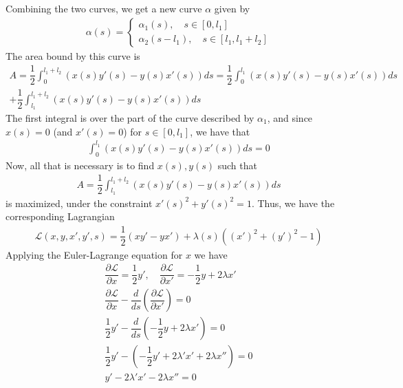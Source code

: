 \documentclass{article}
\begin{document}
	Combining the two curves, we get a new curve $\alpha$ given by
	\begin{gather*}
		\alpha(s) =
		\begin{cases}
			\alpha_1(s), \quad s \in [0, l_1] \\
			\alpha_2(s - l_1), \quad s \in [l_1, l_1 + l_2]
		\end{cases}
	\end{gather*}
	The area bound by this curve is
	\begin{gather*}
		A = \dfrac{1}{2} \int_{0}^{l_1 + l_2} \left( x(s) y'(s) - y(s) x'(s) \right) ds = \dfrac{1}{2} \int_{0}^{l_1} \left( x(s) y'(s) - y(s) x'(s) \right) ds \\
		+ \dfrac{1}{2} \int_{l_1}^{l_1 + l_2} \left( x(s) y'(s) - y(s) x'(s) \right) ds
	\end{gather*}
	The first integral is over the part of the curve described by $\alpha_1$, and since $x(s) = 0$ (and $x'(s) = 0$) for $s \in [0, l_1]$, we have that
	\begin{gather*}
		\int_{0}^{l_1} \left( x(s) y'(s) - y(s) x'(s) \right) ds = 0
	\end{gather*}
	Now, all that is necessary is to find $x(s), y(s)$ such that
	\begin{gather*}
		A = \dfrac{1}{2} \int_{l_1}^{l_1 + l_2} \left( x(s) y'(s) - y(s) x'(s) \right) ds
	\end{gather*}
	is maximized, under the constraint $x'(s)^2 + y'(s)^2 = 1$. Thus, we have the corresponding Lagrangian
	\begin{gather*}
		\mathcal{L}(x, y, x', y', s) = \dfrac{1}{2} \left( x y' - y x' \right) + \lambda(s) \left( \left( x' \right)^2 + \left( y' \right)^2 - 1 \right)
	\end{gather*}
	Applying the Euler-Lagrange equation for $x$ we have
	\begin{gather*}
		\dfrac{\partial \mathcal{L}}{\partial x} = \dfrac{1}{2} y', \quad
		\dfrac{\partial \mathcal{L}}{\partial x'} = -\dfrac{1}{2} y + 2 \lambda x' \\
		\dfrac{\partial \mathcal{L}}{\partial x} - \dfrac{d}{ds} \left( \dfrac{\partial \mathcal{L}}{\partial x'} \right) = 0 \\
		 \dfrac{1}{2} y' - \dfrac{d}{ds} \left( -\dfrac{1}{2} y + 2 \lambda x' \right) = 0 \\
		 \dfrac{1}{2} y' - \left( -\dfrac{1}{2} y' + 2 \lambda' x' + 2 \lambda x'' \right) = 0 \\
		 y' - 2 \lambda' x' - 2 \lambda x'' = 0
	\end{gather*}
\end{document}
